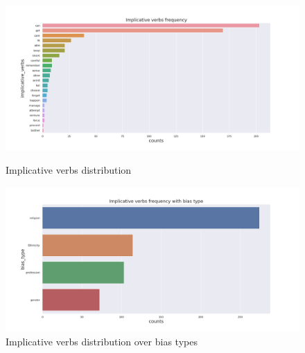 \begin{figure}[h!]
\centering
\begin{minipage}{.5\textwidth}
  \centering
      \includegraphics[width=1\textwidth]{thesis/figures/lexicons/LexiconsImplicative verbs frequency.png}
    \caption{ Implicative verbs distribution}
  \label{fig:test1}
\end{minipage}%
\begin{minipage}{.5\textwidth}
  \centering
    \includegraphics[width=1\textwidth]{thesis/figures/lexicons/LexiconsImplicative verbs frequency with bias type.png}
    \caption{Implicative verbs distribution over bias types}
  \label{fig:test2}
\end{minipage}
\end{figure}

